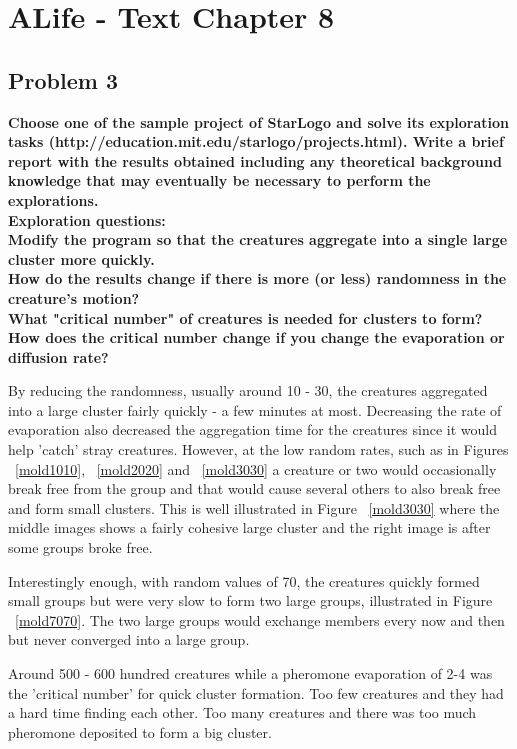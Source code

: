 
\chapter{ALife - Text Chapter 8}

\section{ Problem 3 }
\textbf{ Choose one of the sample project of StarLogo and solve its exploration tasks (http://education.mit.edu/starlogo/projects.html). Write a brief report with the results obtained including any theoretical background knowledge that may eventually be necessary to perform the explorations. } \\
\newline
\textbf{Exploration questions:}\\
\textbf{Modify the program so that the creatures aggregate into a single large cluster more quickly.}\\
\textbf{How do the results change if there is more (or less) randomness in the creature's motion?}\\
\textbf{What "critical number" of creatures is needed for clusters to form? How does the critical number change if you change the evaporation or diffusion rate?}\\
\newline

By reducing the randomness, usually around 10 - 30, the creatures aggregated into a large cluster fairly quickly - a few minutes at most. Decreasing the rate of evaporation also decreased the aggregation time for the creatures since it would help 'catch' stray creatures. However, at the low random rates, such as in Figures ~\ref{mold1010}, ~\ref{mold2020} and ~\ref{mold3030} a creature or two would occasionally break free from the group and that would cause several others to also break free and form small clusters. This is well illustrated in Figure ~\ref{mold3030} where the middle images shows a fairly cohesive large cluster and the right image is after some groups broke free. 

Interestingly enough, with random values of 70, the creatures quickly formed small groups but were very slow to form two large groups, illustrated in Figure ~\ref{mold7070}. The two large groups would exchange members every now and then but never converged into a large group.

Around 500 - 600 hundred creatures while a pheromone evaporation of 2-4 was the 'critical number' for quick cluster formation. Too few creatures and they had a hard time finding each other. Too many creatures and there was too much pheromone deposited to form a big cluster. 

